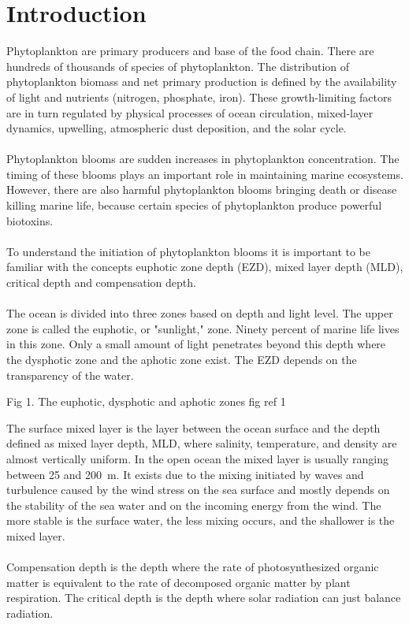 \documentclass[../Main.tex]{subfiles}
\begin{document}
\section*{\crule[blue]{.3cm}{.3cm} Introduction}
Phytoplankton are primary producers and base of the food chain. 
There are hundreds of thousands of species of phytoplankton. 
The distribution of phytoplankton biomass and net primary production is defined by the availability of light and nutrients (nitrogen, phosphate, iron). 
These growth-limiting factors are in turn regulated by physical processes of ocean circulation, mixed-layer dynamics, upwelling, atmospheric dust deposition, and the solar cycle.\supercite{}
\\
\\
Phytoplankton blooms are sudden increases in phytoplankton concentration. 
The timing of these blooms plays an important role in maintaining marine ecosystems. 
However, there are also harmful phytoplankton blooms bringing death or disease killing marine life, 
because certain species of phytoplankton produce powerful biotoxins.\supercite{}
\\
\\
To understand the initiation of phytoplankton blooms it is important to be familiar with the concepts euphotic zone depth (EZD), mixed layer depth (MLD), 
critical depth and compensation depth. 
\\
\\
The ocean is divided into three zones based on depth and light level. 
The upper zone is called the euphotic, or "sunlight," zone. 
Ninety percent of marine life lives in this zone. 
Only a small amount of light penetrates beyond this depth where the dysphotic zone and the aphotic zone exist. 
The EZD depends on the transparency of the water.\supercite{}

Fig 1. The euphotic, dysphotic and aphotic zones fig  ref 1

The surface mixed layer is the layer between the ocean surface and the depth defined as mixed layer depth, MLD, 
where salinity, temperature, and density are almost vertically uniform. 
In the open ocean the mixed layer is usually ranging between 25 and \SI{200}{m}. 
It exists due to the mixing initiated by waves and turbulence caused by the wind stress on the sea surface and mostly depends on the stability of the sea water and on the incoming energy from the wind. 
The more stable is the surface water, the less mixing occurs, and the shallower is the mixed layer.\supercite{}
\\
\\
Compensation depth is the depth where the rate of photosynthesized organic matter is equivalent to the rate of decomposed organic matter by plant respiration. 
The critical depth is the depth where solar radiation can just balance radiation.\supercite{}
\end{document}

